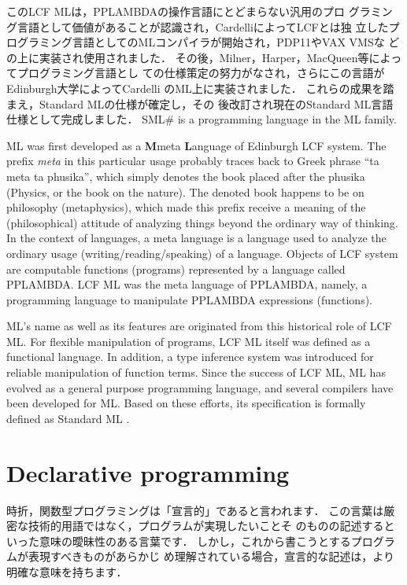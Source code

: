 \documentclass{jbook}
\newcommand{\txt}[2]{#2}
\newcommand{\smlsharp}{SML\#}
\begin{document}
	このLCF MLは，PPLAMBDAの操作言語にとどまらない汎用のプロ
グラミング言語として価値があることが認識され，CardelliによってLCFとは独
立したプログラミング言語としてのMLコンパイラが開始され，PDP11やVAX VMSな
どの上に実装され使用されました．
	その後，Milner，Harper，MacQueen等によってプログラミング言語とし
ての仕様策定の努力がなされ，さらにこの言語がEdinburgh大学によってCardelli
のML上に実装されました．
	これらの成果を踏まえ，Standard MLの仕様\cite{sml}が確定し，その
後改訂され現在のStandard ML言語仕様\cite{sml97}として完成しました．
\else%
	\smlsharp{} is a programming language in the ML family.

	ML was first developed as a {\bf M}meta {\bf L}anguage of
Edinburgh LCF\cite{gord79} system.
	The prefix {\em meta\/} in this particular usage probably traces
back to Greek phrase ``ta meta ta phusika'', which  simply denotes the
book placed after the phusika (Physics, or the book on the nature).
	The denoted book happens to be on philosophy (metaphysics), which
made this prefix receive a meaning of the (philosophical) attitude of
analyzing things beyond the ordinary way of thinking.
	In the context of languages, a meta language is a language used
to analyze the ordinary usage (writing/reading/speaking) of a language.
	Objects of LCF system are computable functions (programs)
represented by a language called PPLAMBDA.
	LCF ML was the meta language of PPLAMBDA, namely, a programming
language to manipulate PPLAMBDA expressions (functions).

	ML's name as well as its features are originated from this
historical role of LCF ML. 
	For flexible manipulation of programs, LCF ML itself was defined
as a functional language.
	In addition, a type inference system was introduced for reliable
manipulation of function terms.
	Since the success of LCF ML, ML has evolved as a general purpose
programming language, and several compilers have been developed for ML.
	Based on these efforts, its specification is formally defined as
Standard ML \cite{sml,sml97}.
\fi%


\section{\txt{宣言的プログラミング}{Declarative programming}}
\label{sec:tutorialDeclarative}

\ifjp%
	時折，関数型プログラミングは「宣言的」であると言われます．
	この言葉は厳密な技術的用語ではなく，プログラムが実現したいことそ
のものの記述するといった意味の曖昧性のある言葉です．
	しかし，これから書こうとするプログラムが表現すべきものがあらかじ
め理解されている場合，宣言的な記述は，より明確な意味を持ちます．
	
\end{document}
